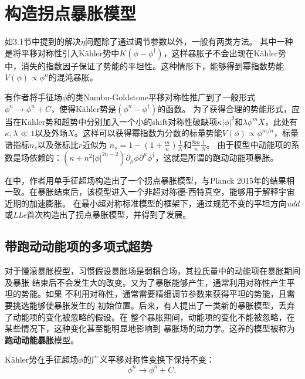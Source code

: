 \section{构造拐点暴胀模型}
如3.1节中提到的解决$\eta$问题\citep{stewart1995inflation,linde1994hybrid,linde1997hybrid,panagiotakopoulos1997hybrid}除了通过调节参数以外，一般有两类方法。
其中一种是将平移对称性引入K\"ahler势中$K(\phi-\phi^\dagger)$，这样暴胀子不会出现在K\"ahler势中，消失的指数因子保证了势能的平坦性。这种情形下，能够得到幂指数势能$V(\phi)\propto
\phi^n$的混沌暴胀。

有作者\citep{takahashi2010linear,nakayama2010running,kasuya2014flat}将手征场$\phi$的类Nambu-Goldstone平移对称性推广到了一般形式$\phi^n\rightarrow
\phi^n+C$，使得K\"ahler势是$\left(\phi^n-\phi^\dagger\right)$的函数。
为了获得合理的势能形式，应当在K\"{a}hler势和超势中分别加入一个小的shift对称性破缺项$\kappa|\phi|^2$和$\lambda\phi^m
X$，此处有$\kappa,\lambda\ll
1$以及外场$X$。这样可以获得幂指数为分数的标量势能$V(\phi)\propto
\phi^{m/n}$，标量谱指标$n_s$以及张标比$r$近似为
$n_s=1-(1+\frac{m}{n})\frac{1}{N}$和$\frac{8m}{n}\frac{1}{N}$\citep{nakayama2010running}。
由于模型中动能项的系数是场依赖的：$(\kappa+n^2|\phi|^{2n-2})\partial_{\mu}\phi\partial^{\mu}\phi^{\dag}$，这就是所谓的跑动动能项暴胀。


在\citep{gao2015inflection}中，作者用单手征超场构造出了一个拐点暴胀模型，与Planck
2015年的结果相一致。在暴胀结束后，该模型进入一个非超对称德-西特真空，能够用于解释宇宙近期的加速膨胀。
在最小超对称标准模型的框架下，通过规范不变的平坦方向\textit{udd}或\textit{LLe}首次构造出了拐点暴胀模型\citep{allahverdi2006gauge}，并得到了发展\citep{allahverdi2007term,enqvist2010inflection,hotchkiss2012observable,chatterjee2015bound}。


\subsection{带跑动动能项的多项式超势}
对于慢滚暴胀模型，习惯假设暴胀场是弱耦合场，其拉氏量中的动能项在暴胀期间及暴胀
结束后不会发生大的改变。又为了暴胀能够产生，通常利用对称性产生平坦的势能。如果
不利用对称性，通常需要精细调节参数来获得平坦的势能，且需要挑选能够使暴胀发生的
初始位置。后来，有人提出了一类新的暴胀模型，丢弃了动能项的变化被忽略的假设。在
整个暴胀期间，动能项的变化不能被忽略，在某些情况下，这种变化甚至能明显地影响到
暴胀场的动力学。这养的模型被称为\textbf{跑动动能暴胀}模型。


K\"ahler势在手征超场$\phi$的广义平移对称性变换下保持不变：
\begin{equation}
    \phi^n \rightarrow \phi^n + C,
\end{equation}

